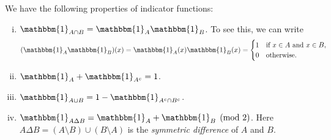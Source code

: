 \begin{remark}
  We have the following properties of indicator functions:
  \begin{enumerate}[(i)]
    \item $\mathbbm{1}_{A \cap B} = \mathbbm{1}_A \mathbbm{1}_B$. To see this, we can write
      \[
        (\mathbbm{1}_A \mathbbm{1}_B)(x) =
        \mathbbm{1}_A(x) \mathbbm{1}_B(x)
        = \begin{cases}
          1 & \text{if } x \in A \text{ and } x \in B, \\
          0 & \text{otherwise}.
        \end{cases}
      \]
    \item $\mathbbm{1}_{A} + \mathbbm{1}_{A^c} = 1$.
    \item $\mathbbm{1}_{A \cup B} = 1 - \mathbbm{1}_{A^c \cap B^c}$.
    \item $\mathbbm{1}_{A \Delta B} = \mathbbm{1}_{A} + \mathbbm{1}_B \pmod{2}$.
      Here $A \Delta B = (A \setminus B) \cup (B \setminus A)$
      is the \emph{symmetric difference}
      of $A$ and $B$.
  \end{enumerate}
\end{remark}

